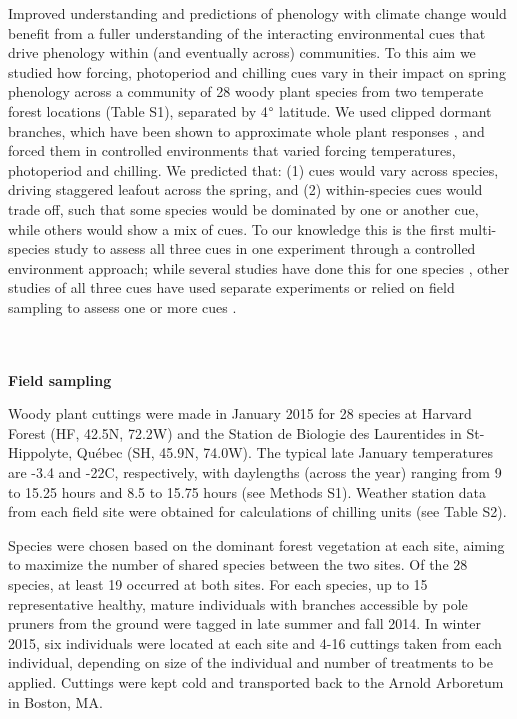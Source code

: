 \documentclass[11pt]{article}
\begin{document}
Improved understanding and predictions of phenology with climate change would benefit from a fuller understanding of the interacting environmental cues that drive phenology within (and eventually across) communities. To this aim we studied how forcing, photoperiod and chilling cues vary in their impact on spring phenology across a community of 28 woody plant species from two temperate forest locations (Table S1), separated by 4$\degree$ latitude. We used clipped dormant branches, which have been shown to approximate whole plant responses \citep{vitasseclippings}, and forced them in controlled environments that varied forcing temperatures, photoperiod and chilling. We predicted that: (1) cues would vary across species, driving staggered leafout across the spring, and (2) within-species cues would trade off, such that some species would be dominated by one or another cue, while others would show a mix of cues. To our knowledge this is the first multi-species study to assess all three cues in one experiment through a controlled environment approach; while several studies have done this for one species \citep{Worrall:1967aa,Skuterud:1994aa,Sogaard:2008aa,Sonsteby:2014aa}, other studies of all three cues have used separate experiments \citep[e.g.,][]{Caffarra:2011ab} or relied on field sampling to assess one or more cues \citep[e.g,][]{Basler:2012aa,laube2014gcb,zohner2016ncc}. 

\vspace{2ex}\\
\vspace{2ex}\\
\noindent \textbf{Field sampling}

\noindent Woody plant cuttings were made in January 2015 for 28 species at Harvard Forest (HF, 42.5\degree N, 72.2\degree W) and the Station de Biologie des Laurentides in St-Hippolyte, Qu\'ebec (SH, 45.9\degree N, 74.0\degree W). The typical late January temperatures are -3.4 and -22\degree C, respectively, with daylengths (across the year) ranging from 9 to 15.25 hours and 8.5 to 15.75 hours (see Methods S1). Weather station data from each field site were obtained for calculations of chilling units (see Table S2). %

Species were chosen based on the dominant forest vegetation at each site, aiming to maximize the number of shared species between the two sites. Of the 28 species, at least 19 occurred at both sites. For each species, up to 15 representative healthy, mature individuals with branches accessible by pole pruners from the ground were tagged in late summer and fall 2014. In winter 2015, six individuals were located at each site and 4-16 cuttings taken from each individual, depending on size of the individual and number of treatments to be applied. Cuttings were kept cold and transported back to the Arnold Arboretum in Boston, MA.
\end{document}
